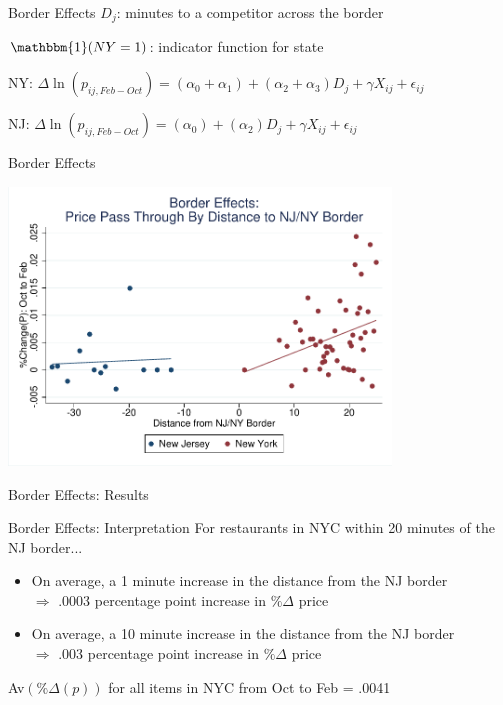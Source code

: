 \documentclass[xcolor=table]{beamer}
\begin{document}
\begin{spacing}{1.2}
\begin{frame}{Border Effects}
$D_j$: minutes to a competitor across the border

$\mathbbm{1}(NY=1)$: indicator function for state

\bigskip

\begin{centering}

NY: $
\Delta \ln (p_{ij,Feb-Oct})  = (\alpha_0 +\alpha_1) +  (\alpha_2 + \alpha_3) D_j +\gamma X_{ij}  + \epsilon_{ij}   
$

\bigskip

NJ:
$
\Delta \ln (p_{ij,Feb-Oct})  = (\alpha_0 ) +  (\alpha_2 ) D_j +\gamma X_{ij}  + \epsilon_{ij}   
$

\end{centering}
\end{frame}

\begin{frame}{Border Effects}

\centering
\includegraphics[width=4in]{total_pricechange_dist_nynj.pdf}
\end{frame}

\begin{frame}{Border Effects: Results}
\centering
\tiny


\end{frame}

\begin{frame}{Border Effects: Interpretation}
For restaurants in NYC within 20 minutes of the NJ border...
\begin{itemize}
\item On average, a 1 minute increase in the distance from the NJ border \\ $\Rightarrow$ .0003 percentage point increase in $\%\Delta$ price 
\item On average, a 10 minute increase in the distance from the NJ border \\ $\Rightarrow$ .003 percentage point increase in $\%\Delta$ price 
\end{itemize}
Av$(\%\Delta(p))$ for all items in NYC from Oct to Feb = .0041


\end{frame}
\end{spacing}
\end{document}
